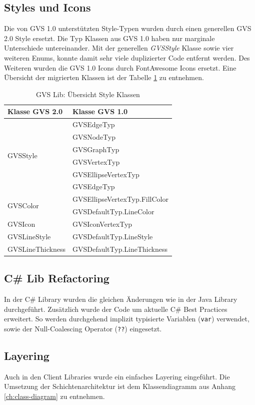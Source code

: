 \documentclass[11pt,a4paper,english,oneside]{book}
\numberwithin{equation}{chapter}
\begin{document}
	\subsection{Styles und Icons}
	Die von GVS 1.0 unterstützten Style-Typen wurden durch einen generellen GVS 2.0 Style ersetzt. Die Typ Klassen aus GVS 1.0 haben nur marginale Unterschiede untereinander. Mit der generellen \textit{GVSStyle} Klasse sowie vier weiteren Enums, konnte damit sehr viele duplizierter Code entfernt werden. Des Weiteren wurden die GVS 1.0 Icons durch FontAwesome Icons ersetzt. Eine Übersicht der migrierten Klassen ist der Tabelle \ref{tbl:styles} zu entnehmen.
	
	\begin{table}[h!]
		\centering
		\begin{tabularx}{\linewidth}{X X}
			\toprule 
			Klasse GVS 2.0 & Klasse GVS 1.0\\
			\midrule
			\multirow{6}{*}{GVSStyle} & 
			GVSEdgeTyp \\ & 
			GVSNodeTyp \\ & 
			GVSGraphTyp  \\ &
			GVSVertexTyp  \\ &
			GVSEllipseVertexTyp \\ &
			GVSEdgeTyp \\
			\midrule
			\multirow{2}{*}{GVSColor} & GVSEllipseVertexTyp.FillColor \\ &
			GVSDefaultTyp.LineColor \\
			\midrule
			GVSIcon & GVSIconVertexTyp \\
			\midrule
			GVSLineStyle & GVSDefaultTyp.LineStyle \\
			\midrule
			GVSLineThickness & GVSDefaultTyp.LineThickness \\
			\bottomrule 
		\end{tabularx} 
		\caption{GVS Lib: Übersicht Style Klassen} 
		\label{tbl:styles}
	\end{table}
	
	\subsection{C\# Lib Refactoring}
	In der C\# Library wurden die gleichen Änderungen wie in der Java Library durchgeführt. Zusätzlich wurde der Code um aktuelle C\# Best Practices erweitert. So werden durchgehend implizit typisierte Variablen (\lstinline|var|) verwendet, sowie der Null-Coalescing Operator (\lstinline|??|) eingesetzt. 
	
	\subsection{Layering}
	Auch in den Client Libraries wurde ein einfaches Layering eingeführt. Die Umsetzung der Schichtenarchitektur ist dem Klassendiagramm aus Anhang \ref{ch:class-diagram} zu entnehmen.	
			
\end{document}
